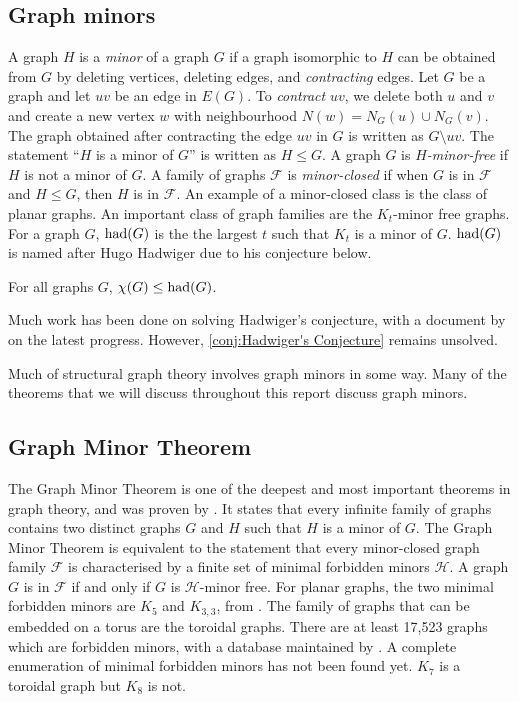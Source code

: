 \subsection{Graph minors}\label{sec:Graph Minors}
A graph \(H\) is a \textit{minor} of a graph \(G\) if a graph isomorphic to \(H\) can be obtained from \(G\) by deleting vertices, deleting edges, and \textit{contracting} edges. Let $G$ be a graph and let $uv$ be an edge in $E(G)$. To \textit{contract} \(uv\), we delete both \(u\) and \(v\) and create a new vertex \(w\) with neighbourhood \(N(w) = N_G(u) \cup N_G(v)\). The graph obtained after contracting the edge \(uv\) in $G$ is written as \(G\setminus uv\).
The statement ``\(H\) is a minor of \(G\)'' is written as \(H \leq G\). A graph \(G\) is \textit{\(H\)-minor-free} if $H$ is not a minor of $G$. A family of graphs \(\mathcal{F}\) is \textit{minor-closed} if when $G$ is in \(\mathcal{F}\) and \(H \leq G\), then $H$ is in \(\mathcal{F}\).
An example of a minor-closed class is the class of planar graphs.
An important class of graph families are the \(K_t\)-minor free graphs. For a graph \(G\), \(\operatorname{had}(G)\) is the the largest \(t\) such that \(K_t\) is a minor of \(G\). $\operatorname{had}(G)$ is named after Hugo Hadwiger due to his conjecture below.

\begin{conjecture}\label{conj:Hadwiger's Conjecture}
	For all graphs \(G\), \(\chi(G) \leq \operatorname{had}(G)\)\cite{hadwigerUeberKlassifikationStreckenkomplexe1943}.
\end{conjecture}
Much work has been done on solving Hadwiger's conjecture, with a document by \textcite{seymourHadwigerConjecture2016} on the latest progress. However, \cref{conj:Hadwiger's Conjecture} remains unsolved. 

 Much of structural graph theory involves graph minors in some way. Many of the theorems that we will discuss throughout this report discuss graph minors. 

 \subsection{Graph Minor Theorem}\label{sec:Graph Minor Theorem}
The Graph Minor Theorem is one of the deepest and most important theorems in graph theory, and was proven by \textcite{robertsonGraphMinorsXX2004}. It states that every infinite family of graphs contains two distinct graphs \(G\) and \(H\) such that \(H\) is a minor of \(G\).
The Graph Minor Theorem is equivalent to the statement that every minor-closed graph family $\mathcal{F}$ is characterised by a finite set of minimal forbidden minors $\mathcal{H}$. A graph $G$ is in $\mathcal{F}$ if and only if $G$ is $\mathcal{H}$-minor free.
For planar graphs, the two minimal forbidden minors are \(K_5\) and \(K_{3,3}\), from \textcite{wagnerUeberEigenschaftEbenen1937}. 
The family of graphs that can be embedded on a torus are the toroidal graphs. There are at least 17,523 graphs which are forbidden minors, with a database maintained by \textcite{myrvoldLargeSetTorus2018}. A complete enumeration of minimal forbidden minors has not been found yet. $K_7$ is a toroidal graph but $K_8$ is not.
